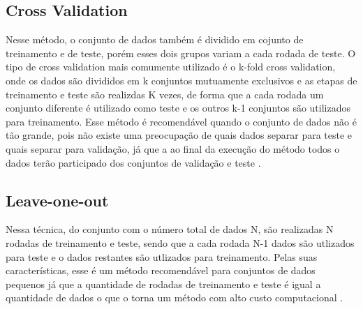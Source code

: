 \subsection {Cross Validation}
Nesse método, o conjunto de dados também é dividido em cojunto de treinamento e de teste, porém esses dois grupos variam a cada rodada de teste. O tipo de cross validation mais comumente utilizado é o k-fold cross validation, onde os dados são divididos em k conjuntos mutuamente exclusivos e as etapas de treinamento e teste são realizdas K vezes, de forma que a cada rodada um conjunto diferente é utilizado como teste e os outros k-1 conjuntos são utilizados para treinamento. Esse método é recomendável quando o conjunto de dados não é tão grande, pois não existe uma  preocupação de quais dados separar para teste e quais separar para validação, já que a ao final da execução do método todos o dados terão participado dos conjuntos de validação e teste \cite{Kohavi95Cross} \cite{Baldisserotto05Validacao}.

\subsection{Leave-one-out}
Nessa técnica, do conjunto com o número total de dados N, são realizadas N rodadas de treinamento e teste, sendo que a cada rodada N-1 dados são utlizados para teste e o dados restantes são utlizados para treinamento. Pelas suas características, esse é um método recomendável para conjuntos de dados pequenos já que a quantidade de rodadas de treinamento e teste é igual a quantidade de dados o que o torna um método com alto custo computacional \cite{Kohavi95Cross} \cite{Baldisserotto05Validacao}.
